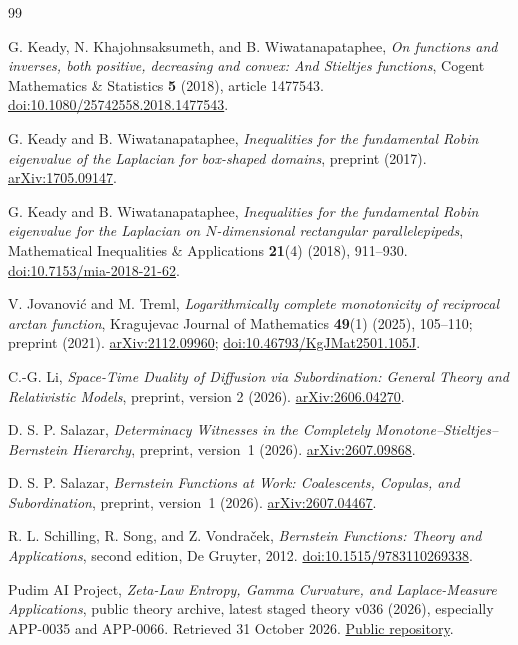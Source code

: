 \documentclass[11pt,a4paper]{article}
\theoremstyle{definition}\newtheorem{definition}[theorem]{Definition}
\theoremstyle{remark}\newtheorem{remark}[theorem]{Remark}
\begin{document}
\begin{thebibliography}{99}

G. Keady, N. Khajohnsaksumeth, and B. Wiwatanapataphee,
\emph{On functions and inverses, both positive, decreasing and
convex: And Stieltjes functions}, Cogent Mathematics \& Statistics
\textbf{5} (2018), article 1477543.
\href{https://doi.org/10.1080/25742558.2018.1477543}{doi:10.1080/25742558.2018.1477543}.

G. Keady and B. Wiwatanapataphee,
\emph{Inequalities for the fundamental Robin eigenvalue of the
Laplacian for box-shaped domains}, preprint (2017).
\href{https://arxiv.org/abs/1705.09147}{arXiv:1705.09147}.

G. Keady and B. Wiwatanapataphee,
\emph{Inequalities for the fundamental Robin eigenvalue for the
Laplacian on $N$-dimensional rectangular parallelepipeds},
Mathematical Inequalities \& Applications \textbf{21}(4)
(2018), 911--930.
\href{https://doi.org/10.7153/mia-2018-21-62}{doi:10.7153/mia-2018-21-62}.

V. Jovanovi\'c and M. Treml,
\emph{Logarithmically complete monotonicity of reciprocal arctan
function}, Kragujevac Journal of Mathematics \textbf{49}(1)
(2025), 105--110; preprint (2021).
\href{https://arxiv.org/abs/2112.09960}{arXiv:2112.09960};
\href{https://doi.org/10.46793/KgJMat2501.105J}{doi:10.46793/KgJMat2501.105J}.

C.-G. Li,
\emph{Space-Time Duality of Diffusion via Subordination: General
Theory and Relativistic Models}, preprint, version 2 (2026).
\href{https://arxiv.org/abs/2606.04270}{arXiv:2606.04270}.

D. S. P. Salazar,
\emph{Determinacy Witnesses in the Completely
Monotone--Stieltjes--Bernstein Hierarchy}, preprint, version~1 (2026).
\href{https://arxiv.org/abs/2607.09868}{arXiv:2607.09868}.

D. S. P. Salazar,
\emph{Bernstein Functions at Work: Coalescents, Copulas, and
Subordination}, preprint, version~1 (2026).
\href{https://arxiv.org/abs/2607.04467}{arXiv:2607.04467}.

R. L. Schilling, R. Song, and Z. Vondra\v{c}ek,
\emph{Bernstein Functions: Theory and Applications}, second
edition, De Gruyter, 2012.
\href{https://doi.org/10.1515/9783110269338}{doi:10.1515/9783110269338}.

Pudim AI Project,
\emph{Zeta-Law Entropy, Gamma Curvature, and Laplace-Measure
Applications}, public theory archive, latest staged theory v036
(2026), especially APP-0035 and APP-0066. Retrieved 31 October 2026.
\href{https://github.com/pudim-project/pudim-ai-demo-zetalaw}{Public repository}.


\end{thebibliography}
\end{document}
